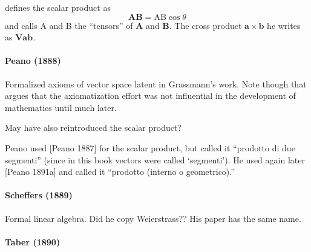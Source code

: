 
\cite[\S 107]{Heaviside1894} defines the scalar product as
\[
\mathbf{AB} = \mathrm{AB} \cos \theta
\]
and calls A and B the ``tensors'' of $\mathbf{A}$ and $\mathbf{B}$. The cross product $\mathbf a \times \mathbf b$ he writes as $\mathbf{V a b}$.

\paragraph{Peano (1888)~\cite{Peano1888}}

Formalized axioms of vector space latent in Grassmann's work. Note though that \cite{Moore1995} argues that the axiomatization effort was not influential in the development of mathematics until much later.

May have also reintroduced the scalar product?

Peano used [Peano 1887]
for the scalar product, but called it “prodotto di due segmenti” (since in this book vectors
were called ‘segmenti’). He used
again later [Peano 1891a] and called it “prodotto
(interno o geometrico).”



\paragraph{Scheffers (1889)~\cite{Scheffers1889}}

Formal linear algebra. Did he copy Weierstrass?? His paper has the same name.


\paragraph{Taber (1890)~\cite{Taber1890}}


